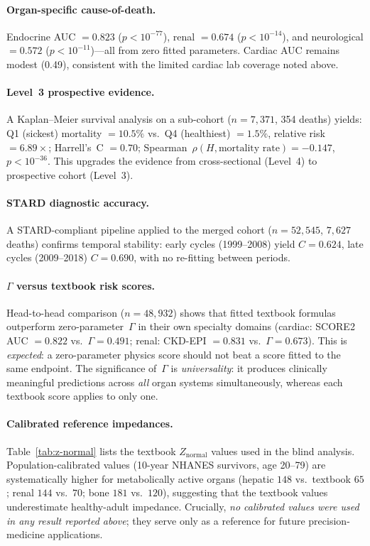 \documentclass[aps,pre,twocolumn,superscriptaddress,floatfix]{revtex4-2}
\begin{document}
\paragraph{Organ-specific cause-of-death.}
Endocrine AUC $= 0.823$ ($p < 10^{-77}$), renal
$= 0.674$ ($p < 10^{-14}$), and neurological
$= 0.572$ ($p < 10^{-11}$)---all from zero fitted
parameters.
Cardiac AUC remains modest (0.49), consistent with
the limited cardiac lab coverage noted above.

\paragraph{Level~3 prospective evidence.}
A Kaplan--Meier survival analysis on a sub-cohort
($n = 7{,}371$, 354 deaths) yields:
Q1 (sickest) mortality $= 10.5\%$ vs.\ Q4 (healthiest)
$= 1.5\%$, relative risk $= 6.89\times$;
Harrell's~C $= 0.70$;
Spearman~$\rho(H, \text{mortality rate}) = -0.147$,
$p < 10^{-36}$.
This upgrades the evidence from cross-sectional
(Level~4) to prospective cohort (Level~3).

\paragraph{STARD diagnostic accuracy.}
A STARD-compliant pipeline applied to the merged
cohort ($n = 52{,}545$, $7{,}627$ deaths) confirms
temporal stability: early cycles (1999--2008)
yield $C = 0.624$, late cycles (2009--2018) $C = 0.690$,
with no re-fitting between periods.

\paragraph{$\Gamma$ versus textbook risk scores.}
Head-to-head comparison ($n = 48{,}932$) shows that
fitted textbook formulas outperform zero-parameter~$\Gamma$
in their own specialty domains (cardiac: SCORE2 AUC
$= 0.822$ vs.\ $\Gamma = 0.491$; renal: CKD-EPI
$= 0.831$ vs.\ $\Gamma = 0.673$).
This is \emph{expected}: a zero-parameter physics score
should not beat a score fitted to the same endpoint.
The significance of~$\Gamma$ is \emph{universality}:
it produces clinically meaningful predictions across
\emph{all} organ systems simultaneously, whereas each
textbook score applies to only one.

\paragraph{Calibrated reference impedances.}
Table~\ref{tab:z-normal} lists the textbook
$Z_{\text{normal}}$ values used in the blind analysis.
Population-calibrated values (10-year NHANES survivors,
age 20--79) are systematically higher for metabolically
active organs (hepatic $148$ vs.\ textbook $65$;
renal $144$ vs.\ $70$; bone $181$ vs.\ $120$),
suggesting that the textbook values underestimate
healthy-adult impedance.
Crucially, \emph{no calibrated values were used in
any result reported above}; they serve only as a
reference for future precision-medicine applications.
\end{document}
